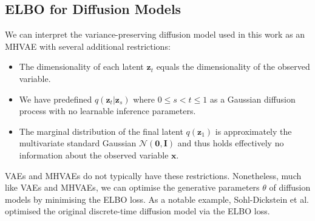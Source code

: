 \documentclass[ oneside,%
                    author={George Herbert},
                    degree={MSci},
                     title={Diffusion Models for Time-Evolving Precipitation Fields},
                  subtitle={}]{dissertation}
\begin{document}
\subsection{ELBO for Diffusion Models}
\label{sec:background_diffusion_elbo}

We can interpret the variance-preserving diffusion model used in this work as an MHVAE with several additional restrictions:
\begin{itemize}
      \item The dimensionality of each latent $\mathbf{z}_t$ equals the dimensionality of the observed variable.
      \item We have predefined $q(\mathbf{z}_t|\mathbf{z}_s)$ where $0\le s<t\le 1$ as a Gaussian diffusion process with no learnable inference parameters.
      \item The marginal distribution of the final latent $q(\mathbf{z}_1)$ is approximately the multivariate standard Gaussian $\mathcal{N}(\mathbf{0}, \mathbf{I})$ and thus holds effectively no information about the observed variable $\mathbf{x}$. 
\end{itemize}
VAEs and MHVAEs do not typically have these restrictions. Nonetheless, much like VAEs and MHVAEs, we can optimise the generative parameters $\theta$ of diffusion models by minimising the ELBO loss. As a notable example, Sohl-Dickstein et al. \cite{Deep_Unsupervised_Learning_Sohl-Dickstein} optimised the original discrete-time diffusion model via the ELBO loss. 
\end{document}
